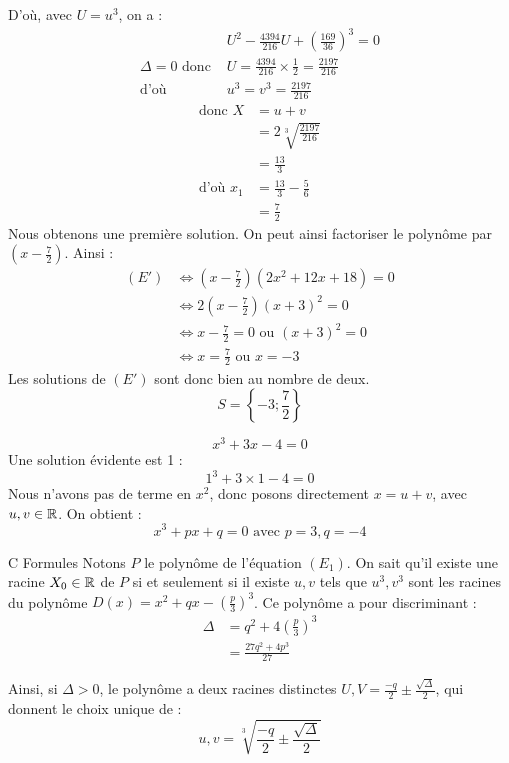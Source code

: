 \documentclass[]{../templates/homework}
\begin{document}
D'où, avec $U = u^3$, on a :
\begin{align*}
	&U^2 - \frac{4394}{216}U + \left( \frac{169}{36} \right)^3 = 0 \\
	\Delta = 0 \text{ donc } &U = \frac{4394}{216} \times \frac{1}{2} = \frac{2197}{216} \\
	\text{d'où } &u^3 = v^3 = \frac{2197}{216}
\end{align*}
\begin{align*}
	\text{donc } X &= u + v \\
	&= 2\sqrt[3]{\frac{2197}{216}} \\
	&= \frac{13}{3} \\
	\text{d'où } x_1 &= \frac{13}{3} - \frac{5}{6} \\
	&= \frac{7}{2}
\end{align*}
Nous obtenons une première solution. On peut ainsi factoriser le polynôme par $(x - \frac{7}{2})$. Ainsi :
\begin{align*}
	(E') & \iff \left( x - \frac{7}{2} \right) (2x^2 + 12x + 18) = 0 \\
	& \iff 2 \left( x - \frac{7}{2} \right) (x+3)^2 = 0 \\
	& \iff x - \frac{7}{2} = 0 \text{ ou } (x+3)^2 = 0 \\
	& \iff x = \frac{7}{2} \text{ ou } x = -3
\end{align*}
Les solutions de $(E')$ sont donc bien au nombre de deux.
$$ S = \left\{ -3 ; \frac{7}{2} \right\} $$

$$ x^3 + 3x - 4 = 0$$
\question Une solution évidente est 1 : $$1^3 + 3\times1 - 4 = 0$$
\question Nous n'avons pas de terme en $x^2$, donc posons directement $x = u+v$, avec $u, v \in \mathbb R$.
On obtient : $$x^3 + px + q = 0 \text{ avec } p=3, q=-4$$

\partie C {Formules}
 Notons $P$ le polynôme de l'équation $(E_1)$. On sait qu'il existe une racine $X_0 \in \mathbb R$ de $P$ si et seulement si il existe $u,v$ tels que $u^3,v^3$ sont les racines du polynôme $D(x) = x^2 + qx - \left(\frac p 3\right)^3$.
Ce polynôme a pour discriminant :
\begin{align*}
	\Delta &= q^2 + 4\left(\frac p 3\right)^3 \\
	&=  \frac {27q^2 + 4p^3}{27}
\end{align*}


Ainsi, si $\Delta > 0$, le polynôme a deux racines distinctes $U,V = \frac {-q}{2} \pm \frac {\sqrt \Delta} {2}$, qui donnent le choix unique de :
$$u,v = \sqrt[3]{\frac {-q}{2} \pm \frac {\sqrt \Delta} {2}}$$
\end{document}
